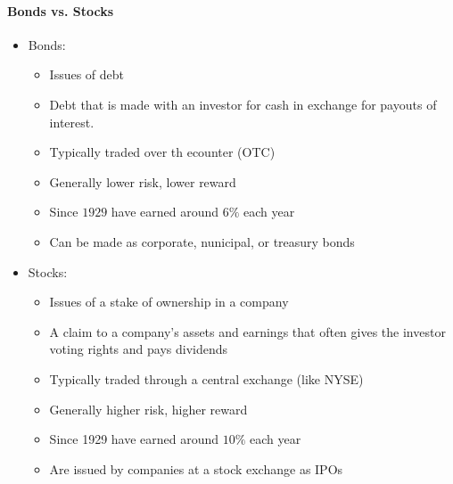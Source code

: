 \paragraph{Bonds vs. Stocks}
\begin{itemize}
    \item Bonds:
        \begin{itemize}
            \item Issues of debt
            \item Debt that is made with an investor for cash in exchange for payouts
                of interest.
            \item Typically traded over th ecounter (OTC)
            \item Generally lower risk, lower reward
            \item Since $1929$ have earned around $6\%$ each year
            \item Can be made as corporate, nunicipal, or treasury bonds
        \end{itemize}
    \item Stocks:
        \begin{itemize}
            \item Issues of a stake of ownership in a company
            \item A claim to a company's assets and earnings that often gives
                the investor voting rights and pays dividends
            \item Typically traded through a central exchange (like NYSE)
            \item Generally higher risk, higher reward
            \item Since 1929 have earned around $10\%$ each year
            \item Are issued by companies at a stock exchange as IPOs
        \end{itemize}
\end{itemize}

